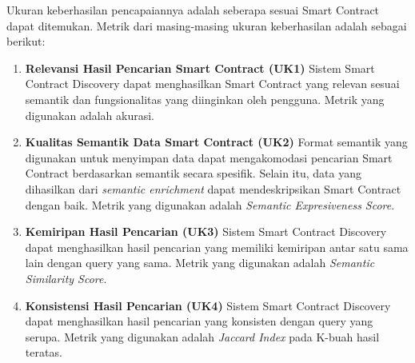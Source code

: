 
Ukuran keberhasilan pencapaiannya adalah seberapa sesuai Smart Contract dapat ditemukan. Metrik dari masing-masing ukuran keberhasilan adalah sebagai berikut:

\begin{enumerate}
	\item \textbf{Relevansi Hasil Pencarian Smart Contract (UK1)} \newline
	      Sistem Smart Contract Discovery dapat menghasilkan Smart Contract yang relevan sesuai semantik dan fungsionalitas yang diinginkan oleh pengguna. Metrik yang digunakan adalah akurasi.

	\item \textbf{Kualitas Semantik Data Smart Contract (UK2)} \newline
	      Format semantik yang digunakan untuk menyimpan data dapat mengakomodasi pencarian Smart Contract berdasarkan semantik secara spesifik. Selain itu, data yang dihasilkan dari \textit{semantic enrichment} dapat mendeskripsikan Smart Contract dengan baik. Metrik yang digunakan adalah \textit{Semantic Expresiveness Score}.

	\item \textbf{Kemiripan Hasil Pencarian (UK3)} \newline
	      Sistem Smart Contract Discovery dapat menghasilkan hasil pencarian yang memiliki kemiripan antar satu sama lain dengan query yang sama. Metrik yang digunakan adalah \textit{Semantic Similarity Score}.

	\item \textbf{Konsistensi Hasil Pencarian (UK4)} \newline
	      Sistem Smart Contract Discovery dapat menghasilkan hasil pencarian yang konsisten dengan query yang serupa. Metrik yang digunakan adalah \textit{Jaccard Index} pada K-buah hasil teratas.


\end{enumerate}
